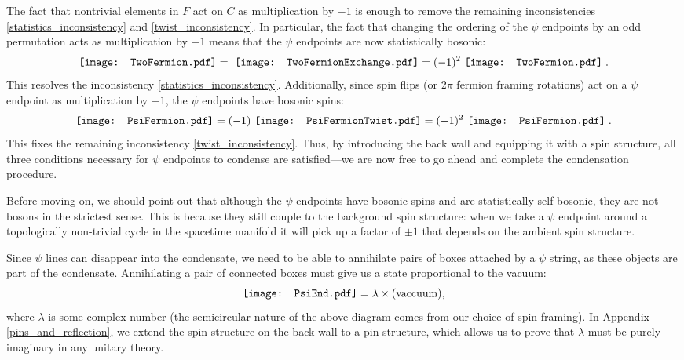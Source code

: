 \documentclass[12pt,a4paper]{article}
\newcommand{\zt}{\mathbb{Z}_2}
\newcommand{\mcf}{\mathcal{F}}
\newcommand{\ethan}[1]{{\color{amethyst}\footnotesize{(EL) #1}}}
\newcommand{\PsiFermion}{\mathord{\vcenter{\hbox{\texttt{[image: PsiFermion.pdf]}}}}}
\newcommand{\PsiFermionTwist}{\mathord{\vcenter{\hbox{\texttt{[image: PsiFermionTwist.pdf]}}}}}
\newcommand{\TwoFermion}{\mathord{\vcenter{\hbox{\texttt{[image: TwoFermion.pdf]}}}}}
\newcommand{\TwoFermionExchange}{\mathord{\vcenter{\hbox{\texttt{[image: TwoFermionExchange.pdf]}}}}}
\newcommand{\PsiEnd}{\mathord{\vcenter{\hbox{\texttt{[image: PsiEnd.pdf]}}}}}
\begin{document}
The fact that nontrivial elements in $F$ act on $C$ as multiplication by $-1$ is enough to remove the remaining inconsistencies \eqref{statistics_inconsistency} and \eqref{twist_inconsistency}.
In particular, the fact that changing the ordering of the $\psi$ endpoints by an odd permutation acts as multiplication by $-1$ means that the $\psi$ endpoints are now statistically bosonic:
\begin{align} \label{boxbraid}
\TwoFermion =\ \TwoFermionExchange = (-1)^2\ \TwoFermion\;.
\end{align}
This resolves the inconsistency \eqref{statistics_inconsistency}. Additionally, since spin flips (or $2\pi$ fermion framing rotations) act on a $\psi$ endpoint as multiplication by $-1$, 
the $\psi$ endpoints have bosonic spins:
\begin{align} \label{boxspin}
\PsiFermion = (-1)\ \PsiFermionTwist = (-1)^2\ \PsiFermion\;. 
\end{align}
This fixes the remaining inconsistency \eqref{twist_inconsistency}. 
Thus, by introducing the back wall and equipping it with a spin structure, all three conditions necessary for $\psi$ endpoints to condense are satisfied---we are now free to go ahead and complete the condensation procedure. 

Before moving on, we should point out that although the $\psi$ endpoints have bosonic spins and are statistically self-bosonic, they are not bosons in the strictest sense. This is because they still couple to the background spin structure: when we take a $\psi$ endpoint around a topologically non-trivial cycle in the spacetime manifold it will pick up a factor of $\pm1$ that depends on the ambient spin structure. 

Since $\psi$ lines can disappear into the condensate, we need to be able to annihilate pairs of boxes attached by a $\psi$ string, as these objects are part of the condensate. 
Annihilating a pair of connected boxes must give us a state proportional to the vacuum:
\begin{align}
\PsiEnd  = \lambda \times \text{(vaccuum)},
\label{EvalPsiPsi}
\end{align}
where $\lambda$ is some complex number (the semicircular nature of the above diagram comes from our choice of spin framing). 
In Appendix \ref{pins_and_reflection}, we extend the spin structure on the back wall to a pin structure, which allows us to prove that $\lambda$ must be purely imaginary in any unitary theory.  
\end{document}
